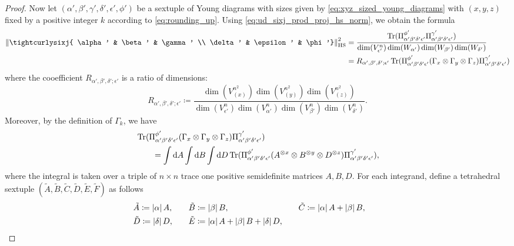 \documentclass[notitlepage, 10pt]{article}
\begin{document}
\begin{proof}
    Now let $(\alpha', \beta', \gamma', \delta', \epsilon', \phi')$ be a sextuple of Young diagrams with sizes given by \cref{eq:xyz_sized_young_diagrams} with $(x,y,z)$ fixed by a positive integer $k$ according to \cref{eq:rounding_up}.
    Using \cref{eq:ud_sixj_prod_proj_hs_norm}, we obtain the formula
    \begin{align}
        \norm{\tightcurlysixj{ \alpha' & \beta' & \gamma' \\ \delta' &  \epsilon' &  \phi'}}_{\mathrm{HS}}^2 
        &=\frac{\Tr(\Pi^{\phi'}_{\alpha'\beta'\delta'\epsilon'}\Pi^{\gamma'}_{\alpha'\beta'\delta'\epsilon'})}{\dim(V_{\epsilon'}^{n})\dim(W_{\alpha'})\dim(W_{\beta'})\dim(W_{\delta'})} \\
        &=R_{\alpha',\beta',\delta';\epsilon'}\Tr(\Pi^{\phi'}_{\alpha'\beta'\delta'\epsilon'} (\Gamma_{x}\ot \Gamma_{y} \ot \Gamma_{z})\Pi^{\gamma'}_{\alpha'\beta'\delta'\epsilon'})
    \end{align}
    where the cooefficient $R_{\alpha',\beta',\delta';\epsilon'}$ is a ratio of dimensions:
    \begin{equation}
        R_{\alpha',\beta',\delta';\epsilon'} \coloneqq \frac{\dim(V_{(x)}^{n^2})\dim(V_{(y)}^{n^2})\dim(V_{(z)}^{n^2})}{\dim(V_{\epsilon'}^{n})\dim(V^{n}_{\alpha'})\dim(V^{n}_{\beta'})\dim(V^{n}_{\delta'})}.
    \end{equation}
    Moreover, by the definition of $\Gamma_k$, we have
    \begin{align}
        &\operatorname{Tr}(\Pi^{\phi'}_{\alpha'\beta'\delta'\epsilon'} (\Gamma_{x}\otimes \Gamma_{y} \otimes \Gamma_{z})\Pi^{\gamma'}_{\alpha'\beta'\delta'\epsilon'})\\
        &\qquad=
        \int \mathrm{d} A \int \mathrm{d} B \int \mathrm{d} D \operatorname{Tr}(\Pi^{\phi'}_{\alpha'\beta'\delta'\epsilon'} (A^{\otimes x} \otimes B^{\otimes y} \otimes D^{\otimes z})\Pi^{\gamma'}_{\alpha'\beta'\delta'\epsilon'}),
    \end{align}
    where the integral is taken over a triple of $n\times n$ trace one positive semidefinite matrices $A,B,D$.
    For each integrand, define a tetrahedral sextuple $(\tilde A,\tilde B,\tilde C,\tilde D,\tilde E,\tilde F)$ as follows
    \begin{equation}
        \begin{alignedat}{3}
            &\tilde A \coloneqq \abs{\alpha}A, \qquad 
            &&\tilde B \coloneqq \abs{\beta}B, \qquad 
            &&\tilde C \coloneqq \abs{\alpha}A+\abs{\beta}B, \qquad \\
            &\tilde D \coloneqq \abs{\delta}D, \qquad 
            &&\tilde E \coloneqq \abs{\alpha}A+\abs{\beta}B+\abs{\delta}D, \qquad 

\end{alignedat}
\end{equation}
\end{proof}
\end{document}
